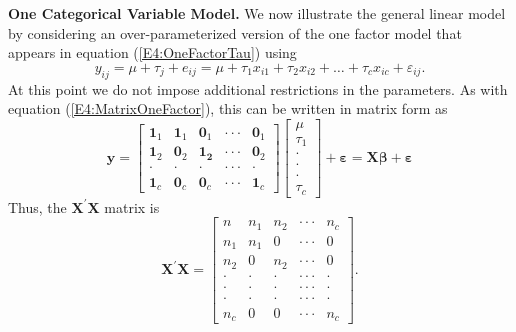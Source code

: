 \textbf{One Categorical Variable Model.} We now illustrate the
general linear model by considering an over-parameterized version of
the one factor model that appears in equation
(\ref{E4:OneFactorTau}) using
\begin{equation*}
y_{ij}=\mu +\tau_j+e_{ij}=\mu +\tau_1x_{i1}+\tau
_2x_{i2}+\ldots+\tau_cx_{ic}+\varepsilon_{ij}.
\end{equation*}
At this point we do not impose additional restrictions in the
parameters. As with equation (\ref{E4:MatrixOneFactor}), this can be
written in matrix form as
\begin{equation*}
\mathbf{y}=
\begin{bmatrix}
\mathbf{1}_1 & \mathbf{1}_1 & \mathbf{0}_1 & \cdot
\cdot \cdot  & \mathbf{0}_1 \\
\mathbf{1}_2 & \mathbf{0}_2 & \mathbf{1}_{\mathbf{2}} & \cdot
\cdot \cdot  & \mathbf{0}_2 \\
\cdot  & \cdot  & \cdot  & \cdot \cdot \cdot  & \cdot  \\
\mathbf{1}_c & \mathbf{0}_c & \mathbf{0}_c & \cdot \cdot \cdot  &
\mathbf{1}_c
\end{bmatrix}
\begin{bmatrix}
\mu  \\
\tau_1 \\
\cdot  \\
\cdot  \\
\cdot  \\
\tau_c
\end{bmatrix}
+\boldsymbol \varepsilon = \mathbf{X \boldsymbol \beta +\boldsymbol
\varepsilon}
\end{equation*}
Thus, the $\mathbf{X}^{\prime}\mathbf{X}$ matrix is
\begin{equation*}
\mathbf{X}^{\prime}\mathbf{X}=%
\begin{bmatrix}
n & n_1 & n_2 & \cdot \cdot \cdot  & n_c \\
n_1 & n_1 & 0 & \cdot \cdot \cdot  & 0 \\
n_2 & 0 & n_2 & \cdot \cdot \cdot  & 0 \\
\cdot  & \cdot  & \cdot  & \cdot \cdot \cdot  & \cdot  \\
\cdot  & \cdot  & \cdot  & \cdot \cdot \cdot  & \cdot  \\
\cdot  & \cdot  & \cdot  & \cdot \cdot \cdot  & \cdot  \\
n_c & 0 & 0 & \cdot \cdot \cdot  & n_c%
\end{bmatrix}.
\end{equation*}

